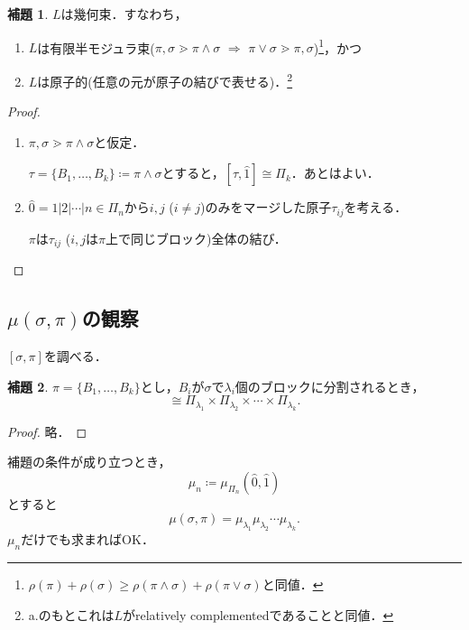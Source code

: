 \documentclass[xelatex,ja=standard,a4paper,14pt,everyparhook=compat]{bxjsarticle}
\theoremstyle{definition}
\newtheorem*{lemma*}{補題}
\begin{document}
\begin{lemma*}
    $L$は幾何束．すなわち， \begin{enumerate}
        \item $L$は有限半モジュラ束($\pi,\sigma \gtrdot \pi \land \sigma$ $\Longrightarrow$ $\pi \lor \sigma \gtrdot \pi,\sigma$)\footnote{$\rho(\pi) + \rho(\sigma) \geq \rho(\pi \land \sigma) + \rho(\pi \lor \sigma)$と同値．}，かつ
        \item $L$は原子的(任意の元が原子の結びで表せる)．\footnote{a.のもとこれは$L$がrelatively complementedであることと同値．}
    \end{enumerate}
\end{lemma*}
\begin{proof}
    \begin{enumerate}
        \item $\pi,\sigma \gtrdot \pi \land \sigma$と仮定．

              $\tau = \{B_1,\ldots,B_k\} \coloneqq \pi \land \sigma$とすると，$[\tau,\hat1] \cong \Pi_k$．あとはよい．

        \item $\hat0 = 1|2|\cdots|n \in\Pi_n$から$i,j$ ($i \neq j$)のみをマージした原子$\tau_{ij}$を考える．

              $\pi$は$\tau_{ij}$ ($i,j$は$\pi$上で同じブロック)全体の結び．
    \end{enumerate}
\end{proof}

\subsection{$\mu(\sigma,\pi)$の観察}

$[\sigma,\pi]$を調べる．

\begin{lemma*}
    $\pi = \{B_1,\ldots,B_k\}$とし，$B_i$が$\sigma$で$\lambda_i$個のブロックに分割されるとき， \begin{equation*}
        [\sigma,\pi] \cong \Pi_{\lambda_1} \times \Pi_{\lambda_2} \times \cdots \times \Pi_{\lambda_k}.
    \end{equation*}
\end{lemma*}
\begin{proof}
    略．
\end{proof}

補題の条件が成り立つとき，
\begin{equation*}
    \mu_n \coloneqq \mu_{\Pi_n}(\hat0, \hat1)
\end{equation*}
とすると \begin{equation*}
    \mu(\sigma, \pi) = \mu_{\lambda_1} \mu_{\lambda_2} \cdots \mu_{\lambda_k}.
\end{equation*}
$\mu_n$だけでも求まればOK．
\end{document}
